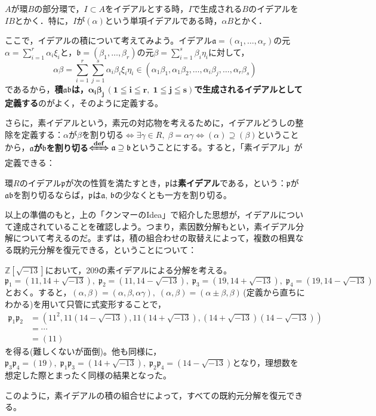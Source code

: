 \begin{dfn}[イデアルが生成するイデアル]
    $A$が環$B$の部分環で，$I\subset A$をイデアルとする時，$I$で生成される$B$のイデアルを$IB$とかく．特に，$I$が$(\alpha)$という単項イデアルである時，$\alpha B$とかく．
\end{dfn}

ここで，イデアルの積について考えてみよう。イデアル$\mathfrak{a}=(\alpha_1,\ldots,\alpha_r)$の元$\alpha=\sum_{i=1}^{r}\alpha_i\xi_i$と，$\mathfrak{b}=(\beta_1,\ldots,\beta_r)$の元$\beta=\sum_{i=1}^{s}\beta_i\eta_i$に対して，\[
\alpha\beta=\sum_{i=1}^{r}\sum_{j=1}^{s}\alpha_i\beta_i\xi_i\eta_i\in(\alpha_1\beta_1,\alpha_1\beta_2,\ldots,\alpha_i\beta_j,\ldots,\alpha_r\beta_s)
\]であるから，\textbf{積$\mathfrak{a}\mathfrak{b}$は，$\boldsymbol{\alpha_i\beta_j\,(1\leqq i\leqq r,\; 1\leqq j\leqq s)}$で生成されるイデアルとして定義する}のがよく，そのように定義する。

さらに，素イデアルという，素元の対応物を考えるために，イデアルどうしの整除を定義する：$\alpha$が$\beta$を割り切る$\iff \exists\gamma\in R,\; \beta=\alpha\gamma \iff (\alpha)\supseteq (\beta)$ということから，\textbf{$\mathfrak{a}$が$\mathfrak{b}$を割り切る$\boldsymbol{\xLeftrightarrow{\mathrm{def}}}\mathfrak{a}\supseteq\mathfrak{b}$}ということにする。すると，「素イデアル」が定義できる：

\begin{dfn}[素イデアル]
    環$R$のイデアル$\mathfrak{p}$が次の性質を満たすとき，$\mathfrak{p}$は\textbf{素イデアル}である，という：$\mathfrak{p}$が$\mathfrak{ab}$を割り切るならば，$\mathfrak{p}$は$\mathfrak{a},\, \mathfrak{b}$の少なくとも一方を割り切る。
\end{dfn}

以上の準備のもと，上の「クンマーのIdea」で紹介した思想が，イデアルについて達成されていることを確認しよう。つまり，素因数分解もとい，素イデアル分解について考えるのだ。まずは，積の組合わせの取替えによって，複数の相異なる既約元分解を復元できる，ということについて：

\begin{mybox}[既約元分解の復元]
    $\mathbb{Z}[\sqrt{-13}]$において，209の素イデアルによる分解を考える。$\mathfrak{p}_1=(11,14+\sqrt{-13}),\; \mathfrak{p}_2=(11,14-\sqrt{-13}),\; \mathfrak{p}_3=(19,14+\sqrt{-13}),\; \mathfrak{p}_4=(19,14-\sqrt{-13})$とおく。すると，$(\alpha,\beta)=(\alpha,\beta,\alpha\gamma),\; (\alpha,\beta)=(\alpha\pm\beta,\beta)$\,(定義から直ちにわかる)を用いて只管に式変形することで，
    \begin{align*}
        \mathfrak{p}_1\mathfrak{p}_2
        &= \left(11^2,11\left(14-\sqrt{-13}\right),11\left(14+\sqrt{-13}\right),\left(14+\sqrt{-13}\right)\left(14-\sqrt{-13}\right)\right)\\
        &= \cdots\\
        &= \left(11\right)
    \end{align*}
    を得る(難しくないが面倒)。他も同様に，$\mathfrak{p}_3\mathfrak{p}_4=(19),\; \mathfrak{p}_1\mathfrak{p}_3=(14+\sqrt{-13}),\; \mathfrak{p}_2\mathfrak{p}_4=(14-\sqrt{-13})$となり，理想数を想定した際とまったく同様の結果となった。

    このように，素イデアルの積の組合せによって，すべての既約元分解を復元できる。
\end{mybox}

